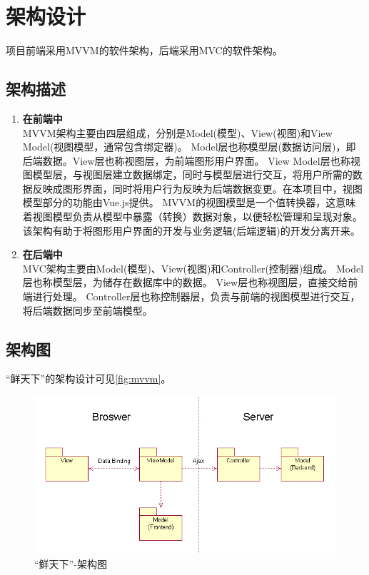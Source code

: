 \chapter{架构设计}

项目前端采用MVVM的软件架构，后端采用MVC的软件架构。

\section{架构描述}

\begin{enumerate}
    \item \textbf{在前端中} \\
    MVVM架构主要由四层组成，分别是Model(模型)、View(视图)和View Model(视图模型，通常包含绑定器)。
    Model层也称模型层(数据访问层)，即后端数据。View层也称视图层，为前端图形用户界面。
    View Model层也称视图模型层，与视图层建立数据绑定，同时与模型层进行交互，将用户所需的数据反映成图形界面，同时将用户行为反映为后端数据变更。在本项目中，视图模型部分的功能由Vue.js提供。
    MVVM的视图模型是一个值转换器，这意味着视图模型负责从模型中暴露（转换）数据对象，以便轻松管理和呈现对象。\\
    该架构有助于将图形用户界面的开发与业务逻辑(后端逻辑)的开发分离开来。
    \item \textbf{在后端中} \\
    MVC架构主要由Model(模型)、View(视图)和Controller(控制器)组成。
    Model层也称模型层，为储存在数据库中的数据。
    View层也称视图层，直接交给前端进行处理。
    Controller层也称控制器层，负责与前端的视图模型进行交互，将后端数据同步至前端模型。
\end{enumerate}


\section{架构图}

“鲜天下”的架构设计可见\autoref{fig:mvvm}。

\begin{figure}[htp]
    \centering
    \includegraphics[width=15cm]{figure/mvvm_new.png}
    \caption{“鲜天下”-架构图}
    \label{fig:mvvm}
\end{figure}


